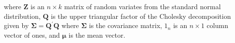 \noindent where
$\mathbf{Z}$
is an
$n \times k$ matrix of random variates
from the standard normal distribution,
$\mathbf{Q}$
is the upper triangular factor
of the Cholesky decomposition
given by
$\boldsymbol{\Sigma} = \mathbf{Q}^{\prime} \mathbf{Q}$
where $\boldsymbol{\Sigma}$ is the covariance matrix,
$1_n$ is an $n \times 1$ column vector of ones,
and $\boldsymbol{\mu}$ is the mean vector.
